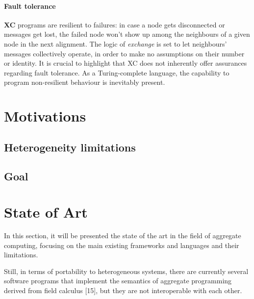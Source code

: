 \paragraph{Fault tolerance}
\textbf{XC} programs are resilient to failures: in case a node gets disconnected or messages get lost, the failed node won't
show up among the neighbours of a given node in the next alignment.
The logic of \emph{exchange} is set to let neighbours' messages collectively operate, in order to make no assumptions
on their number or identity.
It is crucial to highlight that XC does not inherently offer assurances regarding fault tolerance.
As a Turing-complete language, the capability to program non-resilient behaviour is inevitably present.

\section{Motivations}
\label{sec:motivations}


\subsection{Heterogeneity limitations}
\label{subsec:heterogeneity-limitations}


\subsection{Goal}
\label{subsec:goal}


\section{State of Art}
\label{sec:state-of-art}

In this section, it will be presented the state of the art in the field of aggregate computing, focusing on the main existing
frameworks and languages and their limitations.

Still, in terms of portability to heterogeneous systems, there are currently several software programs that implement the
semantics of aggregate programming derived from field calculus [15], but they are not interoperable with each other.

